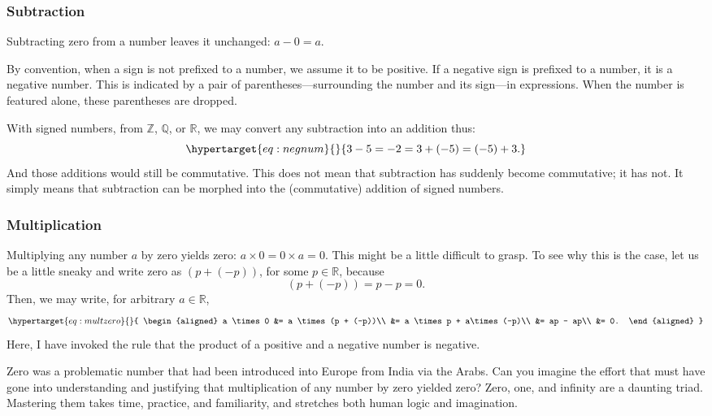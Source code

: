 \documentclass[
  a4paper,
]{article}
\begin{document}
\hypertarget{subtraction}{%
\subsubsection{Subtraction}\label{subtraction}}

Subtracting zero from a number leaves it unchanged: \(a - 0 = a\).

By convention, when a sign is not prefixed to a number, we assume it to
be positive. If a negative sign is prefixed to a number, it is a
negative number. This is indicated by a pair of
parentheses---surrounding the number and its sign---in expressions. When
the number is featured alone, these parentheses are dropped.

With signed numbers, from \(\mathbb{Z}\), \(\mathbb{Q}\), or
\(\mathbb{R}\), we may convert any subtraction into an addition thus:
\begin{equation}\protect\hypertarget{eq:negnum}{}{
3 - 5 = -2 = 3 + (-5) = (-5) + 3.
}\label{eq:negnum}\end{equation} And those additions would still be
commutative. This does not mean that subtraction has suddenly become
commutative; it has not. It simply means that subtraction can be morphed
into the (commutative) addition of signed numbers.

\hypertarget{multiplication}{%
\subsubsection{Multiplication}\label{multiplication}}

Multiplying any number \(a\) by zero yields zero:
\(a \times 0 = 0 \times a = 0\). This might be a little difficult to
grasp. To see why this is the case, let us be a little sneaky and write
zero as \((p + (-p))\), for some \(p \in \mathbb{R}\), because \[
(p + (-p)) = p - p = 0.
\] Then, we may write, for arbitrary \(a \in \mathbb{R}\),
\begin{equation}\protect\hypertarget{eq:multzero}{}{
\begin{aligned}
a \times 0 &= a \times (p + (-p))\\
&= a \times p + a\times (-p)\\
&= ap - ap\\
&= 0.
\end{aligned}
}\label{eq:multzero}\end{equation} Here, I have invoked the rule that
the product of a positive and a negative number is negative.

Zero was a problematic number that had been introduced into Europe from
India via the Arabs. Can you imagine the effort that must have gone into
understanding and justifying that multiplication of any number by zero
yielded zero? Zero, one, and infinity are a daunting triad. Mastering
them takes time, practice, and familiarity, and stretches both human
logic and imagination.
\end{document}
